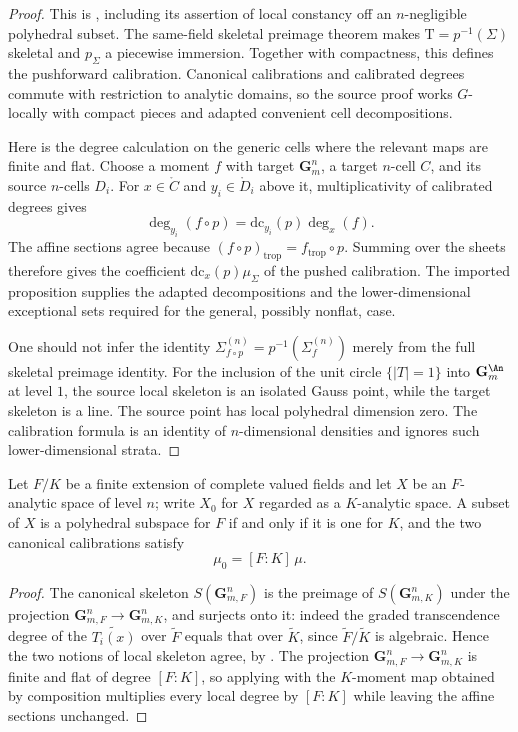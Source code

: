 \begin{proof}
This is \cite[Proposition~14.4.2]{CLD25}, including its assertion of local
constancy off an $n$-negligible polyhedral subset. The same-field skeletal
preimage theorem \cite[Proposition~12.9.6]{CLD25} makes
$\mathrm T=p^{-1}(\Sigma)$ skeletal and $p_\Sigma$ a piecewise immersion.
Together with compactness, this defines the pushforward calibration.
Canonical calibrations and calibrated degrees commute with restriction to
analytic domains, so the source proof works $G$-locally with compact
pieces and adapted convenient cell decompositions.

Here is the degree calculation on the generic cells where the relevant
maps are finite and flat. Choose a moment $f$ with target
$\mathbf G_m^n$, a target $n$-cell $C$, and its source $n$-cells $D_i$.
For $x\in\mathring C$ and $y_i\in\mathring D_i$ above it,
multiplicativity of calibrated degrees gives
\[
 \deg_{y_i}(f\circ p)
   =\mathrm{dc}_{y_i}(p)\deg_x(f).
\]
The affine sections agree because
$(f\circ p)_{\mathrm{trop}}=f_{\mathrm{trop}}\circ p$. Summing over the
sheets therefore gives the coefficient
$\mathrm{dc}_x(p)\mu_\Sigma$ of the pushed calibration. The imported
proposition supplies the adapted decompositions and the lower-dimensional
exceptional sets required for the general, possibly nonflat, case.

One should not infer the identity
$\Sigma_{f\circ p}^{(n)}=p^{-1}(\Sigma_f^{(n)})$ merely from the full
skeletal preimage identity. For the inclusion of the unit circle
$\{|T|=1\}$ into $\mathbf G_m^{\An}$ at level $1$, the source local
skeleton is an isolated Gauss point, while the target skeleton is a line.
The source point has local polyhedral dimension zero. The calibration
formula is an identity of $n$-dimensional densities and ignores such
lower-dimensional strata.
\end{proof}

\begin{corollary}
\label{cor:trop-finite-field-extension}
Let $F/K$ be a finite extension of complete valued fields and let $X$ be an
$F$-analytic space of level $n$; write $X_0$ for $X$ regarded as a
$K$-analytic space. A subset of $X$ is a polyhedral subspace for $F$ if and
only if it is one for $K$, and the two canonical calibrations satisfy
\[
 \mu_0=[F:K]\,\mu .
\]
\end{corollary}

\begin{proof}
The canonical skeleton $S(\mathbf G_{m,F}^n)$ is the preimage of
$S(\mathbf G_{m,K}^n)$ under the projection
$\mathbf G_{m,F}^n\to\mathbf G_{m,K}^n$, and surjects onto it: indeed the
graded transcendence degree of the $\widetilde{T_i(x)}$ over
$\widetilde F$ equals that over $\widetilde K$, since
$\widetilde F/\widetilde K$ is algebraic. Hence the two notions of local
skeleton agree, by . The projection
$\mathbf G_{m,F}^n\to\mathbf G_{m,K}^n$ is finite and flat of degree
$[F:K]$, so applying  with the
$K$-moment map obtained by composition multiplies every local degree by
$[F:K]$ while leaving the affine sections unchanged.
\end{proof}

